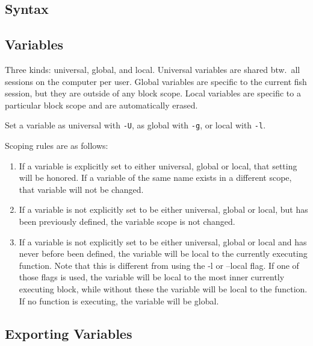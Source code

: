 \documentclass[10pt]{extarticle}
\begin{document}
\begin{paracol}{2}

\section*{Syntax}

\subsection*{Variables}

Three kinds: universal, global, and local.
Universal variables are shared btw.\  all sessions on the computer per user.
Global variables are specific to the current fish session, but they are outside of any block scope.
Local variables are specific to a particular block scope and are automatically erased.

Set a variable as universal with \texttt{-U}, as global with \texttt{-g}, or local with \texttt{-l}.

Scoping rules are as follows:

\begin{enumerate}

\item If a variable is explicitly set to either universal, global or local, that setting will be honored.
    If a variable of the same name exists in a different scope, that variable will not be changed.

\item If a variable is not explicitly set to be either universal, global or local, but has been previously defined, the variable scope is not changed.

\item If a variable is not explicitly set to be either universal, global or local and has never before been defined, the variable will be local to the currently executing function.
    Note that this is different from using the -l or –local flag.
    If one of those flags is used, the variable will be local to the most inner currently executing block, while without these the variable will be local to the function.
    If no function is executing, the variable will be global.

\end{enumerate}

\subsection*{Exporting Variables}


\end{paracol}
\end{document}

